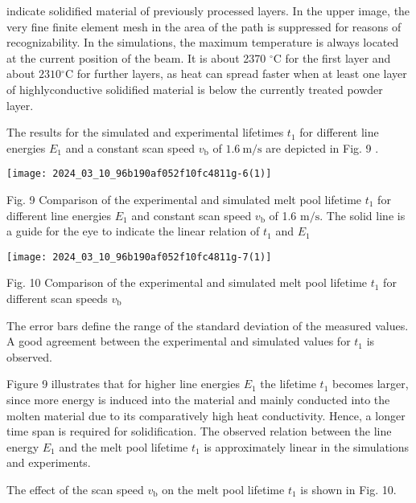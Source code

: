 \documentclass[10pt]{article}
\begin{document}
indicate solidified material of previously processed layers. In the upper image, the very fine finite element mesh in the area of the path is suppressed for reasons of recognizability. In the simulations, the maximum temperature is always located at the current position of the beam. It is about 2370 ${ }^{\circ} \mathrm{C}$ for the first layer and about $2310{ }^{\circ} \mathrm{C}$ for further layers, as heat can spread faster when at least one layer of highlyconductive solidified material is below the currently treated powder layer.

The results for the simulated and experimental lifetimes $t_{1}$ for different line energies $E_{1}$ and a constant scan speed $v_{\mathrm{b}}$ of $1.6 \mathrm{~m} / \mathrm{s}$ are depicted in Fig. 9 .

\begin{center}
\texttt{[image: 2024\_03\_10\_96b190af052f10fc4811g-6(1)]}
\end{center}

Fig. 9 Comparison of the experimental and simulated melt pool lifetime $t_{1}$ for different line energies $E_{1}$ and constant scan speed $v_{\mathrm{b}}$ of 1.6 $\mathrm{m} / \mathrm{s}$. The solid line is a guide for the eye to indicate the linear relation of $t_{1}$ and $E_{1}$

\begin{center}
\texttt{[image: 2024\_03\_10\_96b190af052f10fc4811g-7(1)]}
\end{center}

Fig. 10 Comparison of the experimental and simulated melt pool lifetime $t_{1}$ for different scan speeds $v_{\mathrm{b}}$

The error bars define the range of the standard deviation of the measured values. A good agreement between the experimental and simulated values for $t_{1}$ is observed.

Figure 9 illustrates that for higher line energies $E_{1}$ the lifetime $t_{1}$ becomes larger, since more energy is induced into the material and mainly conducted into the molten material due to its comparatively high heat conductivity. Hence, a longer time span is required for solidification. The observed relation between the line energy $E_{1}$ and the melt pool lifetime $t_{1}$ is approximately linear in the simulations and experiments.

The effect of the scan speed $v_{\mathrm{b}}$ on the melt pool lifetime $t_{1}$ is shown in Fig. 10.
\end{document}
